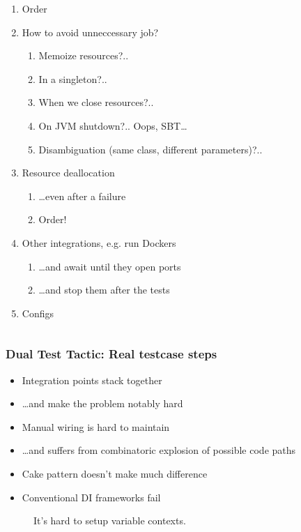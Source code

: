 \documentclass[usenames,dvipsnames]{beamer}
\begin{document}
\begin{frame}
\begin{columns}
  \begin{column}[T]{0.6\textwidth}
  \begin{enumerate}
  \item Order
  \item How to avoid unneccessary job?
    \begin{enumerate}
    \item Memoize resources?..
    \item In a singleton?..
    \item When we close resources?..
    \item On JVM shutdown?.. Oops, SBT\dots
    \item Disambiguation (same class, different parameters)?..
    \end{enumerate}
  \item Resource deallocation
    \begin{enumerate}
    \item \dots even after a failure
    \item Order!
    \end{enumerate}
  \item Other integrations, e.g. run Dockers
    \begin{enumerate}
      \item \dots and await until they open ports
      \item \dots and stop them after the tests
    \end{enumerate}
  \item Configs
  \end{enumerate}
  \end{column}
  \end{columns}


\end{frame}

\begin{frame}
  \frametitle{Dual Test Tactic: Real testcase steps}

  \begin{itemize}
  \item Integration points stack together
  \item \dots and make the problem notably hard

  \item Manual wiring is hard to maintain
  \item \dots and suffers from combinatoric explosion of possible code paths
  \item Cake pattern doesn't make much difference
  \item Conventional DI frameworks fail
  \end{itemize}

  \begin{figure}
  \Large  It's hard to setup variable contexts.
  \end{figure}
\end{frame}
\end{document}
